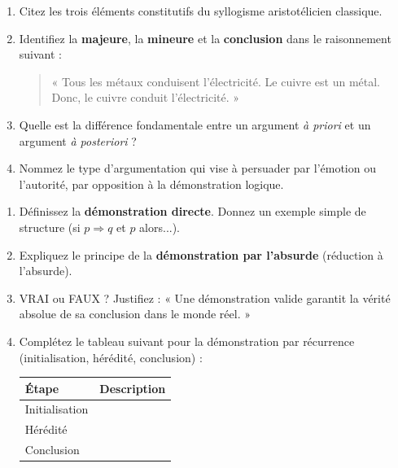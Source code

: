 \documentclass[11pt]{article}
\begin{document}
\begin{exercice}
\begin{enumerate}
    \item Citez les trois éléments constitutifs du syllogisme aristotélicien classique.
    \item Identifiez la \textbf{majeure}, la \textbf{mineure} et la \textbf{conclusion} dans le raisonnement suivant :
    \begin{quote}
    « Tous les métaux conduisent l'électricité. Le cuivre est un métal. Donc, le cuivre conduit l'électricité. »
    \end{quote}
    \item Quelle est la différence fondamentale entre un argument \textit{à priori} et un argument \textit{à posteriori} ?
    \item Nommez le type d'argumentation qui vise à persuader par l'émotion ou l'autorité, par opposition à la démonstration logique.
\end{enumerate}
\end{exercice}

\begin{exercice}[La démonstration]
\begin{enumerate}
    \item Définissez la \textbf{démonstration directe}. Donnez un exemple simple de structure (si $p \Rightarrow q$ et $p$ alors...).
    \item Expliquez le principe de la \textbf{démonstration par l'absurde} (réduction à l'absurde).
    \item VRAI ou FAUX ? Justifiez : « Une démonstration valide garantit la vérité absolue de sa conclusion dans le monde réel. »
    \item Complétez le tableau suivant pour la démonstration par récurrence (initialisation, hérédité, conclusion) :
    \begin{tabular}{|l|p{8cm}|}
    \hline
    \textbf{Étape} & \textbf{Description} \\ \hline
    Initialisation &  \\ \hline
    Hérédité &  \\ \hline
    Conclusion &  \\ \hline
    \end{tabular}
\end{enumerate}
\end{exercice}
\end{document}
